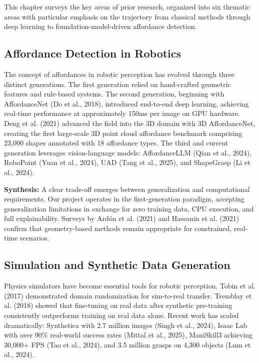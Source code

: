 \documentclass[11pt,a4paper]{article}
\begin{document}
This chapter surveys the key areas of prior research, organized into six thematic areas with particular emphasis on the trajectory from classical methods through deep learning to foundation-model-driven affordance detection.

\subsection{Affordance Detection in Robotics}

The concept of affordances in robotic perception has evolved through three distinct generations. The first generation relied on hand-crafted geometric features and rule-based systems. The second generation, beginning with AffordanceNet (Do et al., 2018), introduced end-to-end deep learning, achieving real-time performance at approximately 150ms per image on GPU hardware. Deng et al. (2021) advanced the field into the 3D domain with 3D AffordanceNet, creating the first large-scale 3D point cloud affordance benchmark comprising 23,000 shapes annotated with 18 affordance types. The third and current generation leverages vision-language models: AffordanceLLM (Qian et al., 2024), RoboPoint (Yuan et al., 2024), UAD (Tang et al., 2025), and ShapeGrasp (Li et al., 2024).

\textbf{Synthesis:} A clear trade-off emerges between generalization and computational requirements. Our project operates in the first-generation paradigm, accepting generalization limitations in exchange for zero training data, CPU execution, and full explainability. Surveys by Ard\'{o}n et al. (2021) and Hassanin et al. (2021) confirm that geometry-based methods remain appropriate for constrained, real-time scenarios.

\subsection{Simulation and Synthetic Data Generation}

Physics simulators have become essential tools for robotic perception. Tobin et al. (2017) demonstrated domain randomization for sim-to-real transfer. Tremblay et al. (2018) showed that fine-tuning on real data after synthetic pre-training consistently outperforms training on real data alone. Recent work has scaled dramatically: Synthetica with 2.7 million images (Singh et al., 2024), Isaac Lab with over 90\% real-world success rates (Mittal et al., 2025), ManiSkill3 achieving 30,000+ FPS (Tao et al., 2024), and 3.5 million grasps on 4,300 objects (Lum et al., 2024).
\end{document}
